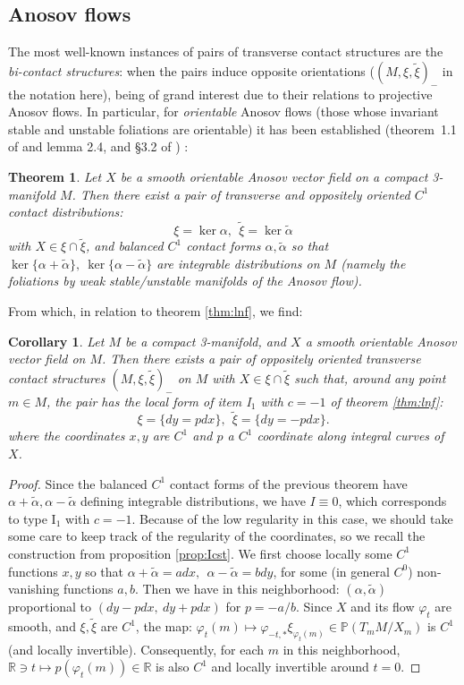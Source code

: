 \documentclass[10pt]{amsart}
\newcommand{\R}{\mathbb{R}}
\newcommand{\fe}{\varphi}
\theoremstyle{definition}
\newtheorem*{teon}{Theorem}
\newtheorem*{corn}{Corollary}
\begin{document}
\subsection{Anosov flows}\label{sec:An}
The most well-known instances of pairs of transverse contact structures are the {\em bi-contact structures}: when the pairs induce opposite orientations ($(M, \xi, \tilde \xi)_-$ in the notation here), being of grand interest due to their relations to projective Anosov flows. In particular, for {\em orientable} Anosov flows (those whose invariant stable and unstable foliations are orientable) it has been established (theorem~1.1 of \cite{Hoz} and lemma 2.4, and \S 3.2 of \cite{Mass}) :

\begin{teon}
    {\em Let $X$ be a smooth orientable Anosov vector field on a compact 3-manifold $M$. Then there exist a pair of transverse and oppositely oriented $C^1$ contact distributions:
    \[ \xi = \ker \alpha, ~~\tilde \xi = \ker \tilde\alpha \]
    with $X\in \xi\cap \tilde \xi$, and balanced $C^1$ contact forms $\alpha, \tilde\alpha$
    so that $\ker\{\alpha + \tilde\alpha\}, ~\ker\{\alpha - \tilde\alpha\}$ are integrable distributions on $M$ (namely the foliations by weak stable/unstable manifolds of the Anosov flow).}
\end{teon}

From which, in relation to theorem \ref{thm:lnf}, we find:

\begin{corn}
    {\em Let $M$ be a compact 3-manifold, and $X$ a smooth orientable Anosov vector field on $M$. Then there exists a pair of oppositely oriented transverse contact structures $(M, \xi, \tilde \xi)_-$ on $M$ with $X\in \xi\cap \tilde \xi$ such that, around any point $m\in M$, the pair has the local form of item I$_1$ with $c = -1$ of theorem \ref{thm:lnf}:
    \[ \xi = \{ dy = p dx\}, ~~\tilde \xi = \{ dy = - p dx\}. \]
    where the coordinates $x,y$ are $C^1$ and $p$ a $C^1$ coordinate along integral curves of $X$.}
\end{corn}
\begin{proof}
    Since the balanced $C^1$ contact forms of the previous theorem have $\alpha + \tilde\alpha, \alpha - \tilde\alpha$ defining integrable distributions, we have $I\equiv 0$, which corresponds to type I$_1$ with $c = -1$. Because of the low regularity in this case, we should take some care to keep track of the regularity of the coordinates, so we recall the construction from proposition \ref{prop:Icst}. We first choose locally some $C^1$ functions $x,y$ so that $\alpha + \tilde\alpha = a dx, ~~\alpha - \tilde\alpha = b dy$, for some (in general $C^0$) non-vanishing functions $a, b$. Then we have in this neighborhood: $(\alpha, \tilde\alpha)$ proportional to $(dy - pdx, ~ dy + pdx)$ for $p = -a/b$. Since $X$ and its flow $\fe_t$ are smooth, and $\xi, \tilde\xi$ are $C^1$, the map: $\fe_t(m) \mapsto  \fe_{-t,*}\xi_{\fe_t(m)} \in \mathbb{P}(T_mM/X_m)$ is $C^1$ (and locally invertible). Consequently, for each $m$ in this neighborhood, $\R\ni t\mapsto p(\fe_t(m))\in \R$ is also $C^1$ and locally invertible around $t = 0$.
\end{proof}
\end{document}
